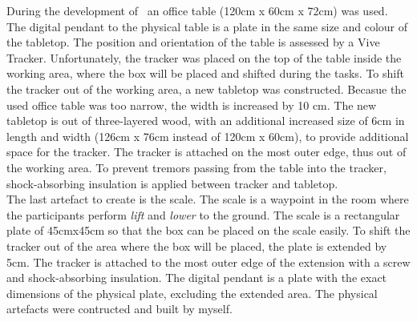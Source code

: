 During the development of \exgo\ an office table (120cm x 60cm x 72cm) was used. The digital pendant to the physical table is a plate in the same size and colour of the tabletop. The position and orientation of the table is assessed by a Vive Tracker. Unfortunately, the tracker was placed on the top of the table inside the working area, where the box will be placed and shifted during the tasks. To shift the tracker out of the working area, a new tabletop was constructed. Becasue the used office table was too narrow, the width is increased by 10 cm. The new tabletop is out of three-layered wood, with an additional increased size of 6cm in length and width (126cm x 76cm instead of 120cm x 60cm), to provide additional space for the tracker. The tracker is attached on the most outer edge, thus out of the working area. To prevent tremors passing from the table into the tracker, shock-absorbing insulation is applied between tracker and tabletop.\\
The last artefact to create is the scale. The scale is a waypoint in the room where the participants perform \textit{lift} and \textit{lower} to the ground. The scale is a rectangular plate of 45cmx45cm so that the box can be placed on the scale easily. To shift the tracker out of the area where the box will be placed, the plate is extended by 5cm. The tracker is attached to the most outer edge of the extension with a screw and shock-absorbing insulation. The digital pendant is a plate with the exact dimensions of the physical plate, excluding the extended area. The physical artefacts were contructed and built by myself.\\

